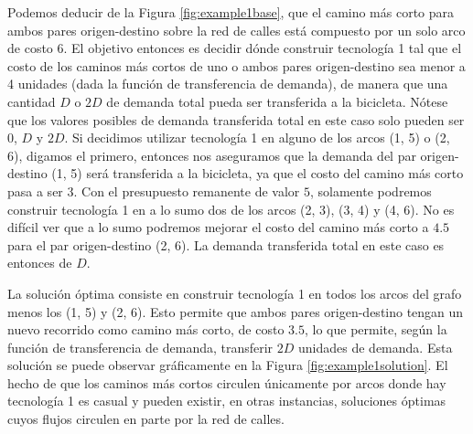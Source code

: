 Podemos deducir de la Figura \ref{fig:example1base}, que el camino más corto para ambos pares origen-destino sobre la red de calles está compuesto por un solo arco de costo 6. El objetivo entonces es decidir dónde construir tecnología 1 tal que el costo de los caminos más cortos de uno o ambos pares origen-destino sea menor a 4 unidades (dada la función de transferencia de demanda), de manera que una cantidad $D$ o $2D$ de demanda total pueda ser transferida a la bicicleta. Nótese que los valores posibles de demanda transferida total en este caso solo pueden ser $0$, $D$ y $2D$. Si decidimos utilizar tecnología 1 en alguno de los arcos (1, 5) o (2, 6), digamos el primero, entonces nos aseguramos que la demanda del par origen-destino (1, 5) será transferida a la bicicleta, ya que el costo del camino más corto pasa a ser $3$. Con el presupuesto remanente de valor $5$, solamente podremos construir tecnología 1 en a lo sumo dos de los arcos (2, 3), (3, 4) y (4, 6). No es difícil ver que a lo sumo podremos mejorar el costo del camino más corto a $4.5$ para el par origen-destino (2, 6). La demanda transferida total en este caso es entonces de $D$.

La solución óptima consiste en construir tecnología 1 en todos los arcos del grafo menos los (1, 5) y (2, 6). Esto permite que ambos pares origen-destino tengan un nuevo recorrido como camino más corto, de costo $3.5$, lo que permite, según la función de transferencia de demanda, transferir $2D$ unidades de demanda. Esta solución se puede observar gráficamente en la Figura \ref{fig:example1solution}. El hecho de que los caminos más cortos circulen únicamente por arcos donde hay tecnología 1 es casual y pueden existir, en otras instancias, soluciones óptimas cuyos flujos circulen en parte por la red de calles.

